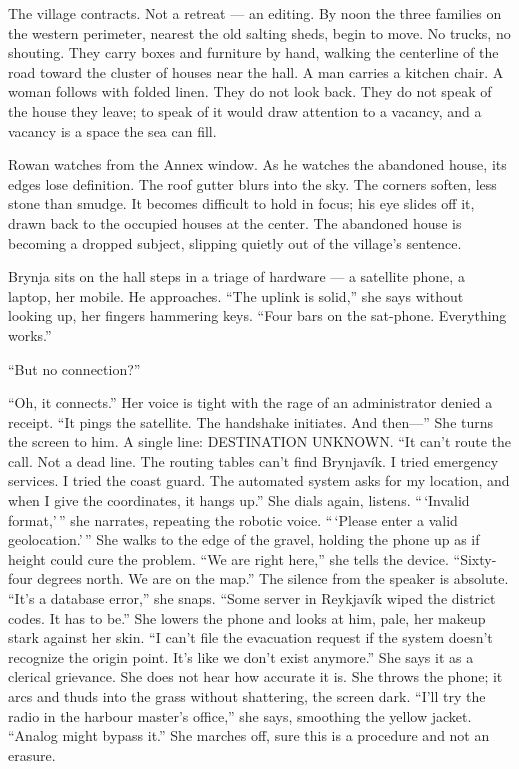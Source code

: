 \documentclass[11pt,oneside]{book}
\newcommand{\sceneline}{%
  \par\vspace{1.2em}
  \begin{center}
    \fontsize{11}{11}\selectfont \textbullet\quad\textbullet\quad\textbullet
  \end{center}
  \vspace{0.6em}\noindent\ignorespaces
}
\begin{document}
\sceneline

The village contracts. Not a retreat --- an editing. By noon the three
families on the western perimeter, nearest the old salting sheds, begin
to move. No trucks, no shouting. They carry boxes and furniture by hand,
walking the centerline of the road toward the cluster of houses near the
hall. A man carries a kitchen chair. A woman follows with folded linen.
They do not look back. They do not speak of the house they leave; to
speak of it would draw attention to a vacancy, and a vacancy is a space
the sea can fill.

Rowan watches from the Annex window. As he watches the abandoned house,
its edges lose definition. The roof gutter blurs into the sky. The
corners soften, less stone than smudge. It becomes difficult to hold in
focus; his eye slides off it, drawn back to the occupied houses at the
center. The abandoned house is becoming a dropped subject, slipping
quietly out of the village's sentence.

Brynja sits on the hall steps in a triage of hardware --- a satellite
phone, a laptop, her mobile. He approaches. ``The uplink is solid,'' she
says without looking up, her fingers hammering keys. ``Four bars on the
sat-phone. Everything works.''

``But no connection?''

``Oh, it connects.'' Her voice is tight with the rage of an
administrator denied a receipt. ``It pings the satellite. The handshake
initiates. And then---'' She turns the screen to him. A single line:
DESTINATION UNKNOWN. ``It can't route the call. Not a dead line. The
routing tables can't find Brynjavík. I tried emergency services. I tried
the coast guard. The automated system asks for my location, and when I
give the coordinates, it hangs up.'' She dials again, listens.
``\,`Invalid format,'\,'' she narrates, repeating the robotic voice.
``\,`Please enter a valid geolocation.'\,'' She walks to the edge of the
gravel, holding the phone up as if height could cure the problem. ``We
are right here,'' she tells the device. ``Sixty-four degrees north. We
are on the map.'' The silence from the speaker is absolute. ``It's a
database error,'' she snaps. ``Some server in Reykjavík wiped the
district codes. It has to be.'' She lowers the phone and looks at him,
pale, her makeup stark against her skin. ``I can't file the evacuation
request if the system doesn't recognize the origin point. It's like we
don't exist anymore.'' She says it as a clerical grievance. She does not
hear how accurate it is. She throws the phone; it arcs and thuds into
the grass without shattering, the screen dark. ``I'll try the radio in
the harbour master's office,'' she says, smoothing the yellow jacket.
``Analog might bypass it.'' She marches off, sure this is a procedure
and not an erasure.
\end{document}
